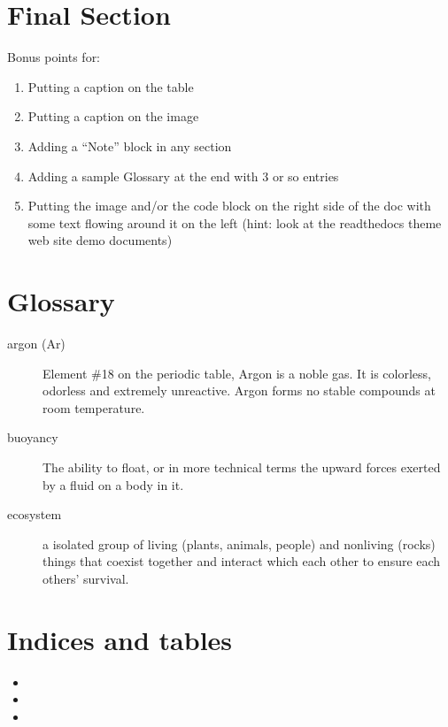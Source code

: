 \documentclass[letterpaper,10pt,english]{sphinxmanual}
\begin{document}
\chapter{Final Section}
\label{\detokenize{main:final-section}}
Bonus points for:
\begin{enumerate}
%
\item {} 
Putting a caption on the table

\item {} 
Putting a caption on the image

\item {} 
Adding a “Note” block in any section

\item {} 
Adding a sample Glossary at the end with 3 or so entries

\item {} 
Putting the image and/or the code block on the right side of the doc with some text flowing around it on the left (hint: look at the readthedocs theme web site demo documents)

\end{enumerate}


\chapter{Glossary}
\label{\detokenize{main:glossary}}\begin{description}
\item[{argon (Ar)\label{\detokenize{main:term-argon-ar}}}] \leavevmode
Element \#18 on the periodic table, Argon is a noble gas. It is colorless, odorless and extremely unreactive. Argon forms no stable compounds at room temperature.

\item[{buoyancy\label{\detokenize{main:term-buoyancy}}}] \leavevmode
The ability to float, or in more technical terms \textendash{} the upward forces exerted by a fluid on a body in it.

\item[{ecosystem\label{\detokenize{main:term-ecosystem}}}] \leavevmode
a isolated group of living (plants, animals, people) and non\sphinxhyphen{}living (rocks) things that coexist together and interact which each other to ensure each others’ survival.

\end{description}


\chapter{Indices and tables}
\label{\detokenize{index:indices-and-tables}}\begin{itemize}
\item {} 

\item {} 

\item {} 

\end{itemize}



\renewcommand{\indexname}{Index}
\printindex
\end{document}
